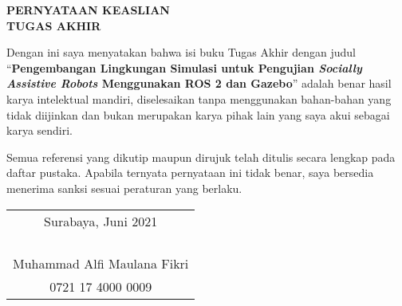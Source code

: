 \begin{center}
  \large
  \textbf{PERNYATAAN KEASLIAN\\TUGAS AKHIR}
\end{center}

\thispagestyle{empty}
\vspace{2ex}

Dengan ini saya menyatakan bahwa isi buku Tugas Akhir dengan judul
``\textbf{Pengembangan Lingkungan Simulasi untuk Pengujian \emph{Socially Assistive Robots} Menggunakan ROS 2 dan Gazebo}''
adalah benar hasil karya intelektual mandiri, diselesaikan tanpa menggunakan bahan-bahan yang tidak diijinkan dan bukan merupakan karya pihak lain yang saya akui sebagai karya sendiri.

Semua referensi yang dikutip maupun dirujuk telah ditulis secara lengkap pada daftar pustaka.
Apabila ternyata pernyataan ini tidak benar, saya bersedia menerima sanksi sesuai peraturan yang berlaku.

\vspace{4ex}

\begin{flushright}
  \begin{tabular}[b]{c}
    Surabaya, Juni 2021\\
    \\
    \\
    \\
    \\
    Muhammad Alfi Maulana Fikri\\
    0721 17 4000 0009
  \end{tabular}
\end{flushright}
